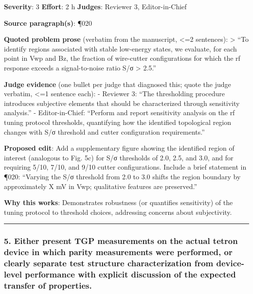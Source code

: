 \documentclass[10pt,letterpaper]{article}
\begin{document}
\textbf{Severity}: 3 \textbf{Effort}: 2 h \textbf{Judges}: Reviewer 3, Editor-in-Chief

\textbf{Source paragraph(s)}: ¶020

\textbf{Quoted problem prose} (verbatim from the manuscript, \textless=2 sentences):
\textgreater{} ``To identify regions associated with stable low-energy states, we evaluate, for each point in Vwp and Bz, the fraction of wire-cutter configurations for which the rf response exceeds a signal-to-noise ratio S/σ \textgreater{} 2.5.''

\textbf{Judge evidence} (one bullet per judge that diagnosed this; quote the judge verbatim, \textless=1 sentence each):
- Reviewer 3: ``The thresholding procedure introduces subjective elements that should be characterized through sensitivity analysis.''
- Editor-in-Chief: ``Perform and report sensitivity analysis on the rf tuning protocol thresholds, quantifying how the identified topological region changes with S/σ threshold and cutter configuration requirements.''

\textbf{Proposed edit}: Add a supplementary figure showing the identified region of interest (analogous to Fig. 5c) for S/σ thresholds of 2.0, 2.5, and 3.0, and for requiring 5/10, 7/10, and 9/10 cutter configurations. Include a brief statement in ¶020: ``Varying the S/σ threshold from 2.0 to 3.0 shifts the region boundary by approximately X mV in Vwp; qualitative features are preserved.''

\textbf{Why this works}: Demonstrates robustness (or quantifies sensitivity) of the tuning protocol to threshold choices, addressing concerns about subjectivity.

\begin{center}\rule{0.5\linewidth}{0.5pt}\end{center}

\hypertarget{either-present-tgp-measurements-on-the-actual-tetron-device-in-which-parity-measurements-were-performed-or-clearly-separate-test-structure-characterization-from-device-level-performance-with-explicit-discussion-of-the-expected-transfer-of-properties.}{%
\subsubsection{5. Either present TGP measurements on the actual tetron device in which parity measurements were performed, or clearly separate test structure characterization from device-level performance with explicit discussion of the expected transfer of properties.}\label{either-present-tgp-measurements-on-the-actual-tetron-device-in-which-parity-measurements-were-performed-or-clearly-separate-test-structure-characterization-from-device-level-performance-with-explicit-discussion-of-the-expected-transfer-of-properties.}}
\end{document}
